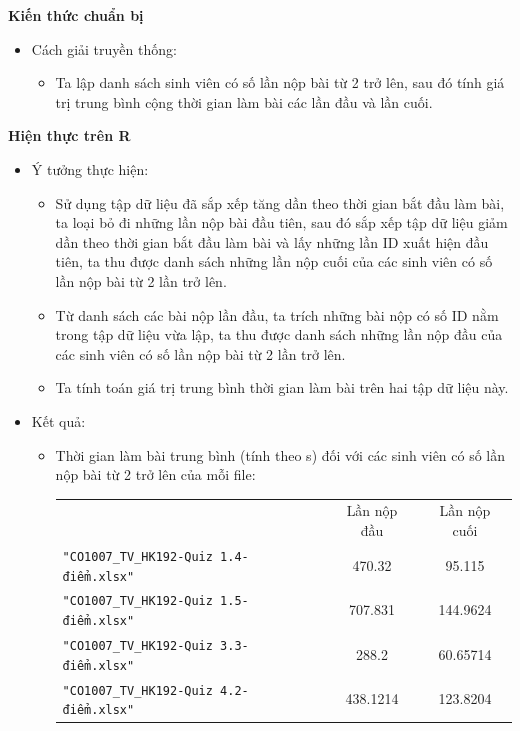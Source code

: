 \documentclass[a4paper]{article}
\theoremstyle{definition}
\begin{document}
\begin{enumerate}[a)]
    \bf Kiến thức chuẩn bị\normalfont
    \begin{itemize}
        \item Cách giải truyền thống:
        \begin{itemize}
            \item Ta lập danh sách sinh viên có số lần nộp bài từ 2 trở lên, sau đó tính giá trị trung bình cộng thời gian làm bài các lần đầu và lần cuối.
        \end{itemize}
    \end{itemize}
    \bf Hiện thực trên R\normalfont
    \begin{itemize}
        \item Ý tưởng thực hiện:
        \begin{itemize}
            \item Sử dụng tập dữ liệu đã sắp xếp tăng dần theo thời gian bắt đầu làm bài, ta loại bỏ đi những lần nộp bài đầu tiên, sau đó sắp xếp tập dữ liệu giảm dần theo thời gian bắt đầu làm bài và lấy những lần ID xuất hiện đầu tiên, ta thu được danh sách những lần nộp cuối của các sinh viên có số lần nộp bài từ 2 lần trở lên.
            \item Từ danh sách các bài nộp lần đầu, ta trích những bài nộp có số ID nằm trong tập dữ liệu vừa lập, ta thu được danh sách những lần nộp đầu của các sinh viên có số lần nộp bài từ 2 lần trở lên.
            \item Ta tính toán giá trị trung bình thời gian làm bài trên hai tập dữ liệu này.
        \end{itemize}
        \item Kết quả:
        \begin{itemize}
            \item Thời gian làm bài trung bình (tính theo s) đối với các sinh viên có số lần nộp bài từ 2 trở lên của mỗi file:
            \begin{center}
                \begin{tabular}{l c c}
                     & Lần nộp đầu & Lần nộp cuối\\
                     \texttt{"CO1007\_TV\_HK192-Quiz 1.4-điểm.xlsx"} & 470.32 & 95.115 \\ 
                     \texttt{"CO1007\_TV\_HK192-Quiz 1.5-điểm.xlsx"} & 707.831 & 144.9624\\ 
                     \texttt{"CO1007\_TV\_HK192-Quiz 3.3-điểm.xlsx"} & 288.2 & 60.65714\\ 
                     \texttt{"CO1007\_TV\_HK192-Quiz 4.2-điểm.xlsx"} & 438.1214 & 123.8204\\ 

\end{tabular}
\end{center}
\end{itemize}
\end{itemize}
\end{enumerate}
\end{document}
